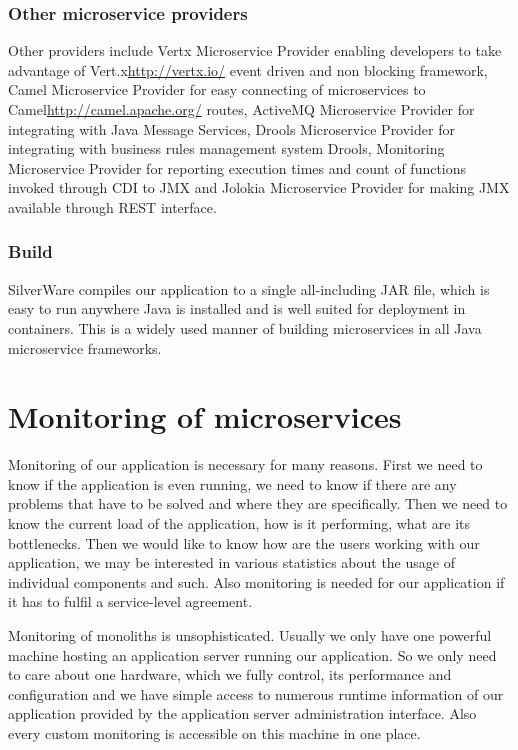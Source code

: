 \documentclass[12pt,oneside]{fithesis2}
\begin{document}
\subsection{Other microservice providers}
Other providers include Vertx Microservice Provider enabling developers to take advantage of Vert.x{\url{http://vertx.io/}} event driven and non blocking framework, Camel Microservice Provider for easy connecting of microservices to Camel{\url{http://camel.apache.org/}} routes, ActiveMQ Microservice Provider for integrating with Java Message Services, Drools Microservice Provider for integrating with business rules management system Drools, Monitoring Microservice Provider for reporting execution times and count of functions invoked through CDI to JMX and Jolokia Microservice Provider for making JMX available through REST interface.

\subsection{Build}
SilverWare compiles our application to a single all-including JAR file, which is easy to run anywhere Java is installed and is well suited for deployment in containers. This is a widely used manner of building microservices in all Java microservice frameworks.

\chapter{Monitoring of microservices}

Monitoring of our application is necessary for many reasons. First we need to know if the application is even running, we need to know if there are any problems that have to be solved and where they are specifically. Then we need to know the current load of the application, how is it performing, what are its bottlenecks. Then we would like to know how are the users working with our application, we may be interested in various statistics about the usage of individual components and such. Also monitoring is needed for our application if it has to fulfil a service-level agreement.

Monitoring of monoliths is unsophisticated. Usually we only have one powerful machine hosting an application server running our application. So we only need to care about one hardware, which we fully control, its performance and configuration and we have simple access to numerous runtime information of our application provided by the application server administration interface. Also every custom monitoring is accessible on this machine in one place.
\end{document}

